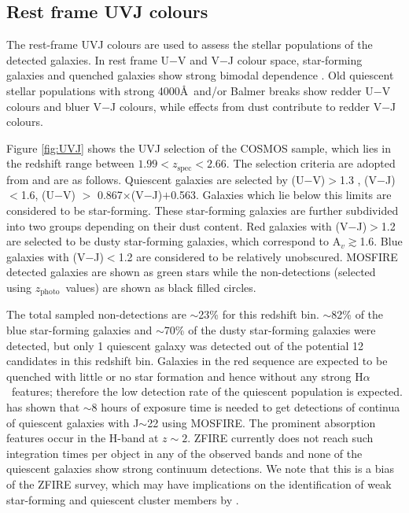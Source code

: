 \documentclass[iop]{emulateapj}
\newcommand{\Halpha}{H$\alpha$}
\newcommand{\around}{$\sim$}
\newcommand{\zspec}{$z_{\mathrm{spec}}$}
\newcommand{\zphoto}{$z_{\mathrm{photo}}$}
\begin{document}
\subsection{Rest frame UVJ colours}
\label{sec:UVJ}


The rest-frame UVJ colours are used to assess the stellar populations of the detected galaxies. 
In rest frame U$-$V and V$-$J colour space, star-forming galaxies and quenched galaxies show strong bimodal dependence \citep{Williams2009}. Old quiescent stellar populations with strong 4000\AA\ and/or Balmer breaks show redder U$-$V colours and bluer V$-$J colours, while effects from dust contribute to redder V$-$J colours. 

Figure \ref{fig:UVJ} shows the UVJ selection of the COSMOS sample, which lies in the redshift range between $1.99<$\zspec$<2.66$. 
The selection criteria are adopted from \citet{Spitler2014} and are as follows.
Quiescent galaxies are selected by (U$-$V)$>$1.3 , (V$-$J)$<$1.6, (U$-$V) $>$ 0.867$\times$(V$-$J)$+$0.563. 
Galaxies which lie below this limits are considered to be star-forming. 
These star-forming galaxies are further subdivided into two groups depending on their dust content. Red galaxies with (V$-$J)$>$1.2 are selected to be dusty star-forming galaxies, which correspond to A$_{v}\gtrsim$1.6. Blue galaxies with (V$-$J)$<$1.2 are considered to be relatively unobscured. MOSFIRE detected galaxies are shown as green stars while the non-detections (selected using \zphoto\ values) are shown as black filled circles. 

The total sampled non-detections are \around23\% for this redshift bin. 
\around82\% of the blue star-forming galaxies and \around70\% of the dusty star-forming galaxies were detected, but only 1 quiescent galaxy was detected out of the potential 12 candidates in this redshift bin. 
Galaxies in the red sequence are expected to be quenched with little or no star formation and hence without any strong \Halpha\ features; therefore the low detection rate of the quiescent population is expected. \citet{Belli2014} has shown that \around8 hours of exposure time is needed to get detections of continua of quiescent galaxies with J\around22 using MOSFIRE. 
The prominent absorption features occur in the H-band at $z\sim2$. ZFIRE currently does not reach such integration times per object in any of the observed bands and none of the quiescent galaxies show strong continuum detections.  We note that this is a bias of the ZFIRE survey, which may have implications on the identification of weak star-forming and quiescent cluster members by \citet{Yuan2014}. 
\end{document}

